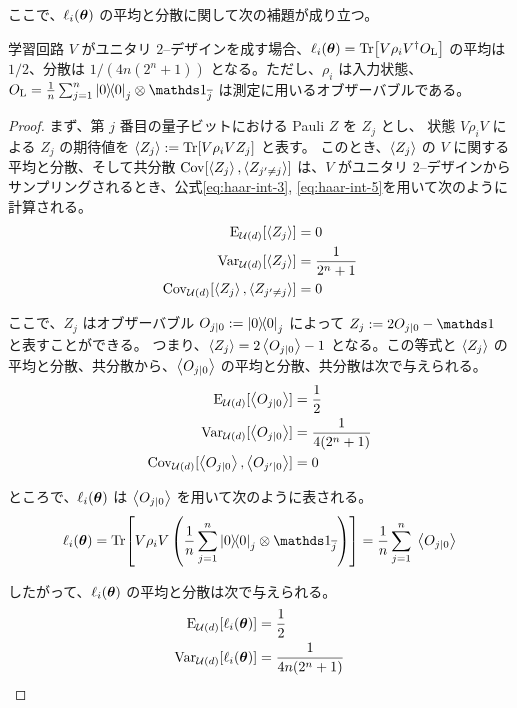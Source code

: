 ここで、$\ell_i(\boldsymbol{\theta})$ の平均と分散に関して次の補題が成り立つ。 
\begin{screen}
    \begin{lemma}\label{lem:ell-mean-var}
        学習回路 $V$ がユニタリ $2$--デザインを成す場合、$\ell_i(\boldsymbol{\theta}) = \Tr[V\rho_iV^\dagger O_{\mathrm{L}}]$ の平均は $1/2$、分散は $1/(4n(2^n+1))$ となる。ただし、$\rho_i$ は入力状態、$O_{\rmL} = \frac{1}{n} \sum_{j=1}^{n}\dyad{0}_{j} \otimes \bbid_{\bar{j}}$ は測定に用いるオブザーバブルである。
    \end{lemma}
\end{screen}

\begin{proof}
    まず、第 $j$ 番目の量子ビットにおける Pauli $Z$ を $Z_j$ とし、
    状態 $V\rho_iV$ による $Z_j$ の期待値を $\ev{Z_j} := \Tr[V\rho_iV Z_j]$ と表す。
    このとき、$\ev{Z_j}$ の $V$ に関する平均と分散、そして共分散 $\Cov[\ev{Z_j},\ev{Z_{j\prm\neq j}}]$ は、$V$ がユニタリ $2$--デザインからサンプリングされるとき、公式\eqref{eq:haar-int-3}, \eqref{eq:haar-int-5}を用いて次のように計算される。
    \begin{align}
        \E_{\calU(d)}[\ev{Z_j}]   &=  0\\
        \Var_{\calU(d)}[\ev{Z_j}] &= \frac{1}{2^n+1}\\
        \Cov_{\calU(d)}[\ev{Z_j},\ev{Z_{j\prm\neq j}}] &= 0
    \end{align}

    ここで、$Z_j$ はオブザーバブル $O_{j|0} := \dyad{0}_j$ によって $Z_j := 2O_{j|0} - \bbid$ と表すことができる。
    つまり、$\ev{Z_j} = 2\ev{O_{j|0}} - 1$ となる。この等式と $\ev{Z_j}$ の平均と分散、共分散から、$\ev{O_{j|0}}$ の平均と分散、共分散は次で与えられる。
    \begin{align}
        \E_{\calU(d)}[\ev{O_{j|0}}]   &= \frac{1}{2}\\
        \Var_{\calU(d)}[\ev{O_{j|0}}] &= \frac{1}{4(2^n+1)}\\
        \Cov_{\calU(d)}[\ev{O_{j|0}},\ev{O_{j\prm|0}}] &= 0
    \end{align}

    ところで、$\ell_i(\boldsymbol{\theta})$ は $\ev{O_{j|0}}$ を用いて次のように表される。
    \begin{align}
        \ell_i(\bs{\th}) = \Tr[V\rho_iV\,\qty(\frac{1}{n} \sum_{j=1}^{n}\dyad{0}_{j} \otimes \bbid_{\bar{j}})] = \frac1n\sum_{j=1}^n \; \ev{O_{j|0}}
    \end{align}

    したがって、$\ell_i(\boldsymbol{\theta})$ の平均と分散は次で与えられる。
    \begin{align}
        \operatorname{E}_{\mathcal{U}(d)}[\ell_i(\boldsymbol{\theta})]   &= \frac{1}{2}\\
        \operatorname{Var}_{\mathcal{U}(d)}[\ell_i(\boldsymbol{\theta})] &= \frac{1}{4n(2^n+1)}\label{eq:ell-var}
    \end{align}
\end{proof}



